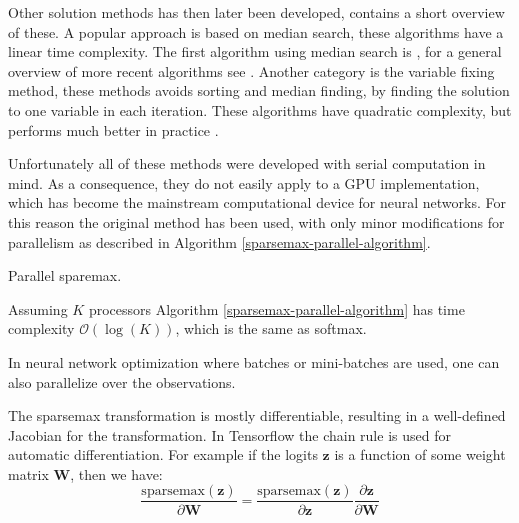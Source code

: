Other solution methods has then later been developed, \cite{Liu2016} contains a short overview of these. A popular approach is based on median search, these algorithms have a linear time complexity. The first algorithm using median search is \cite{brucker1984a}, for a general overview of more recent algorithms see \cite{kiwiel2008a-median}. Another category is the variable fixing method, these methods avoids sorting and median finding, by finding the solution to one variable in each iteration. These algorithms have quadratic complexity, but performs much better in practice \cite{kiwiel2008a-fixing}.

Unfortunately all of these methods were developed with serial computation in mind. As a consequence, they do not easily apply to a GPU implementation, which has become the mainstream computational device for neural networks. For this reason the original method \cite{Helgason1980} has been used, with only minor modifications for parallelism as described in Algorithm \ref{sparsemax-parallel-algorithm}.

\begin{algorithm}[H]
  \caption{Parallel sparemax.}
  \begin{algorithmic}[1]
       
       
       
      \State {}
    \EndFunction
  \end{algorithmic}
  \label{sparsemax-parallel-algorithm}
\end{algorithm}

Assuming $K$ processors Algorithm \ref{sparsemax-parallel-algorithm} has time complexity $\mathcal{O}(\log(K))$, which is the same as softmax.

In neural network optimization where batches or mini-batches are used, one can also parallelize over the observations.

The sparsemax transformation is mostly differentiable, resulting in a well-defined Jacobian for the transformation. In Tensorflow \cite{tensorflow2015-whitepaper} the chain rule is used for automatic differentiation. For example if the logits $\mathbf{z}$ is a function of some weight matrix $\mathbf{W}$, then we have:
\begin{equation}
\frac{\mathrm{sparsemax}(\mathbf{z})}{\partial \mathbf{W}} = \frac{\mathrm{sparsemax}(\mathbf{z})}{\partial \mathbf{z}} \frac{\partial \mathbf{z}}{\partial \mathbf{W}}
\end{equation}

